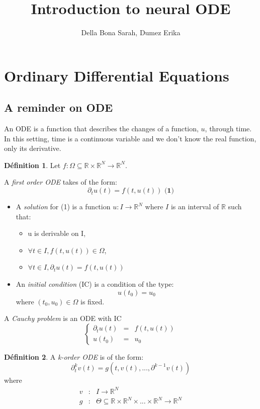 \documentclass[10pt,a4paper]{article}
\author{Della Bona Sarah, Dumez Erika}
\title{Introduction to neural ODE}
\theoremstyle{definition}
\newtheorem{definition}{Définition}
\theoremstyle{theorem}
\begin{document}
\maketitle
 
 
\section{Ordinary Differential Equations}

\subsection{A reminder on ODE}

An ODE is a function that describes the changes of a function, $u$, through time. In this setting, time is a continuous variable and we don't know the real function, only its derivative.

\begin{definition}
Let $f: \Omega \subseteq \mathbb{R} \times \mathbb{R}^N \rightarrow \mathbb{R}^N$. 

A \textit{first order ODE} takes of the form:
\[
\partial_t u(t) = f(t,u(t)) \textbf{   (1)}
\]

\begin{itemize}
\item A \textit{solution} for (1) is a function $u : I \rightarrow \mathbb{R}^N$ where $I$ is an interval of $\mathbb{R}$ such that:
	\begin{itemize}
	\item u is derivable on I,
	\item $\forall t \in I, f(t, u(t)) \in \Omega$,
	\item $\forall t \in I, \partial_t u(t) = f(t, u(t))$
	\end{itemize}
\item An \textit{initial condition} (IC) is a condition of the type:
\[
u(t_0) = u_0
\]
where $(t_0, u_0) \in \Omega$ is fixed.
\end{itemize}
\item A \textit{Cauchy problem} is an ODE with IC
\[
\left \{
\begin{array}{rcl}
\partial_t u(t) & = & f(t, u(t)) \\
u(t_0) & = & u_0
\end{array}
\right.
\]
\end{definition}

\begin{definition}
A \textit{k-order ODE} is of the form:
\[
\partial^k_t v(t) = g(t, v(t), ... , \partial^{k-1}v(t))
\]
where 
   \begin{eqnarray}
   \nonumber
   v & : & I \rightarrow \mathbb{R}^N \\ 
   \nonumber
   g & : & \Theta \subseteq \mathbb{R} \times \mathbb{R}^N \times ... \times \mathbb{R}^N \rightarrow \mathbb{R}^N
   \end{eqnarray}
\end{definition}
\end{document}
